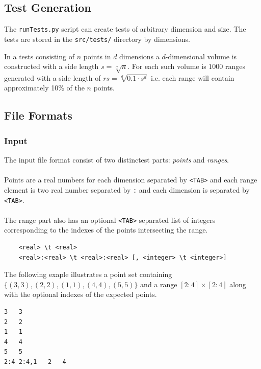 \documentclass{article}
\begin{document}
    \subsection{Test Generation}
    The \verb|runTests.py| script can create tests of arbitrary dimension and 
    size. The tests are stored in the \verb|src/tests/| directory by dimensions.
    
    In a tests consisting of $n$ points in $d$ dimensions a $d$-dimensional 
    volume is constructed with a side length $s = \sqrt[d]{n}$. For each such 
    volume is $1000$ ranges generated with a side length of 
    $rs = \sqrt[d]{0.1 \cdot s^d}$ i.e. each range will contain approximately 
    10\% of the $n$ points. 
  
  
  \subsection{File Formats}
  \subsubsection{Input}
  The input file format consist of two distinctest parts: \textit{points} and 
  \textit{ranges}. 
  \\
  \\
  Points are a real numbers for each dimension separated by \verb|<TAB>| and 
  each range element is two real number separated by \verb|:| and each dimension
  is separated by \verb|<TAB>|.
  \\
  \\
  The range part also has an optional \verb|<TAB>| separated list of integers 
  corresponding to the indexes of the points intersecting the range.  
  \begin{verbatim}
  	<real> \t <real>
  	<real>:<real> \t <real>:<real> [, <integer> \t <integer>]
  \end{verbatim}
  The following exaple illustrates a point set containing 
  $\{(3,3),(2,2),(1,1),(4,4),(5,5)\}$ and a range $[2:4]\times[2:4]$ along with 
  the optional indexes of the expected points.  
\begin{lstlisting}
3	3
2	2
1	1
4	4
5	5
2:4	2:4,1	2	4
\end{lstlisting}
\newpage
\end{document}

